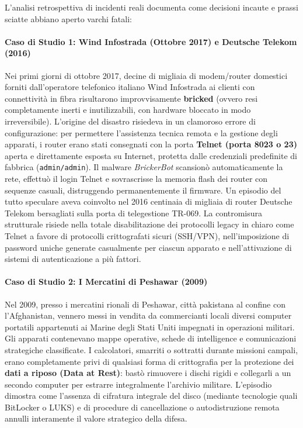 \documentclass[../../main.tex]{subfiles}
\begin{document}
L'analisi retrospettiva di incidenti reali documenta come decisioni incaute e prassi sciatte abbiano aperto varchi fatali:

\paragraph{Caso di Studio 1: Wind Infostrada (Ottobre 2017) e Deutsche Telekom (2016)}
Nei primi giorni di ottobre 2017, decine di migliaia di modem/router domestici forniti dall'operatore telefonico italiano Wind Infostrada ai clienti con connettività in fibra risultarono improvvisamente \textbf{bricked} (ovvero resi completamente inerti e inutilizzabili, con hardware bloccato in modo irreversibile). L'origine del disastro risiedeva in un clamoroso errore di configurazione: per permettere l'assistenza tecnica remota e la gestione degli apparati, i router erano stati consegnati con la porta \textbf{Telnet (porta 8023 o 23)} aperta e direttamente esposta su Internet, protetta dalle credenziali predefinite di fabbrica (\texttt{admin/admin}). Il malware \textit{BrickerBot} scansionò automaticamente la rete, effettuò il login Telnet e sovrascrisse la memoria flash dei router con sequenze casuali, distruggendo permanentemente il firmware. Un episodio del tutto speculare aveva coinvolto nel 2016 centinaia di migliaia di router Deutsche Telekom bersagliati sulla porta di telegestione TR-069. La contromisura strutturale risiede nella totale disabilitazione dei protocolli legacy in chiaro come Telnet a favore di protocolli crittografati sicuri (SSH/VPN), nell'imposizione di password uniche generate casualmente per ciascun apparato e nell'attivazione di sistemi di autenticazione a più fattori.

\paragraph{Caso di Studio 2: I Mercatini di Peshawar (2009)}
Nel 2009, presso i mercatini rionali di Peshawar, città pakistana al confine con l'Afghanistan, vennero messi in vendita da commercianti locali diversi computer portatili appartenuti ai Marine degli Stati Uniti impegnati in operazioni militari. Gli apparati contenevano mappe operative, schede di intelligence e comunicazioni strategiche classificate. I calcolatori, smarriti o sottratti durante missioni campali, erano completamente privi di qualsiasi forma di crittografia per la protezione dei \textbf{dati a riposo (Data at Rest)}: bastò rimuovere i dischi rigidi e collegarli a un secondo computer per estrarre integralmente l'archivio militare. L'episodio dimostra come l'assenza di cifratura integrale del disco (mediante tecnologie quali BitLocker o LUKS) e di procedure di cancellazione o autodistruzione remota annulli interamente il valore strategico della difesa.
\end{document}
